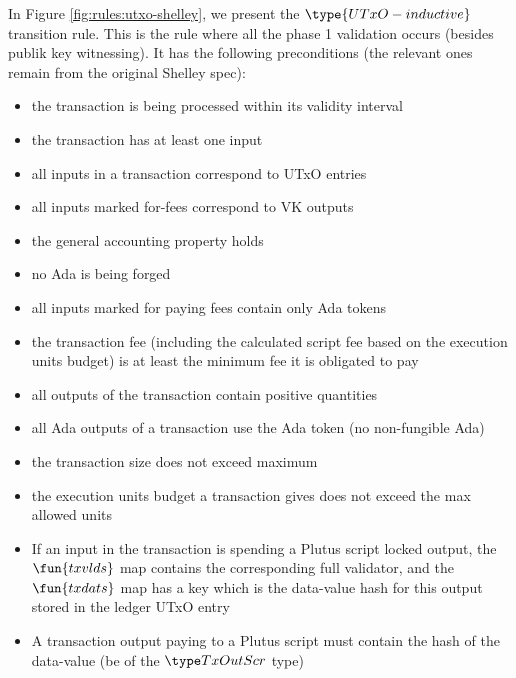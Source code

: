 In Figure \ref{fig:rules:utxo-shelley}, we present the $\type{UTxO-inductive}$
transition rule. This is the rule where all the phase 1 validation occurs
(besides publik key witnessing).
It has the following preconditions (the relevant ones remain
from the original Shelley spec):

\begin{itemize}
  \item the transaction is being processed within its validity interval

  \item the transaction has at least one input

  \item all inputs in a transaction correspond to UTxO entries

  \item all inputs marked for-fees correspond to VK outputs

  \item the general accounting property holds

  \item no Ada is being forged

  \item all inputs marked for paying fees contain only Ada tokens

  \item the transaction fee (including the calculated script fee
  based on the execution units budget) is at least the minimum fee it is obligated to pay

  \item all outputs of the transaction contain positive quantities

  \item all Ada outputs of a transaction use the Ada token (no non-fungible Ada)

  \item the transaction size does not exceed maximum

  \item the execution units budget a transaction gives does not exceed the max
  allowed units

  \item If an input in the transaction is spending a Plutus script locked output,
  the $\fun{txvlds}$ map contains the corresponding full validator, and the
  $\fun{txdats}$ map has a key which is the
  data-value hash for this output stored in the ledger UTxO entry

  \item A transaction output paying to a Plutus script must
  contain the hash of the data-value (be of the $\TxOutScr$ type)


\end{itemize}
